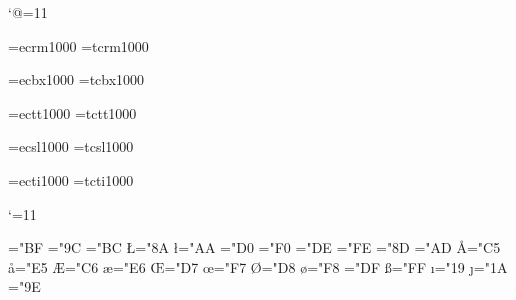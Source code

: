 \catcode`@=11




\font\tenrm=ecrm1000 %
\font\tctenrm=tcrm1000

\font\tenbf=ecbx1000 %
\font\tctenbf=tcbx1000

\font\tentt=ectt1000 %
\font\tctentt=tctt1000

\font\tensl=ecsl1000 %
\font\tctensl=tcsl1000

\font\tenit=ecti1000 %
\font\tctenit=tcti1000







\def\rm{\fam\z@\let\tcfont\tctenrm\tenrm}
\def\it{\fam\itfam\let\tcfont\tctenit\tenit}
\def\sl{\fam\slfam\let\tcfont\tctensl\tensl}
\def\bf{\fam\bffam\let\tcfont\tctenbf\tenbf}
\def\tt{\fam\ttfam\let\tcfont\tctentt\tentt}

\rm

\catcode`\@=11

\chardef\pound="BF
\chardef\IJ="9C
\chardef\ij="BC
\chardef\L="8A
\chardef\l="AA
\chardef\DH="D0
\chardef\dh="F0
\chardef\TH="DE
\chardef\th="FE
\chardef\NG="8D
\chardef\ng="AD
\chardef\AA="C5
\chardef\aa="E5
\chardef\AE="C6
\chardef\ae="E6
\chardef\OE="D7
\chardef\oe="F7
\chardef\O="D8
\chardef\o="F8
\chardef\SS="DF
\chardef\ss="FF
\chardef\i="19
\chardef\j="1A
\let\DJ=\DH
\chardef\dj="9E

\def\@firstoftwo#1#2{#1}
\def\@secondoftwo#1#2{#2}
\def\@ifundefined#1{\expandafter\ifx\csname#1\endcsname\relax
  \expandafter\@firstoftwo\else\expandafter\@secondoftwo\fi}

